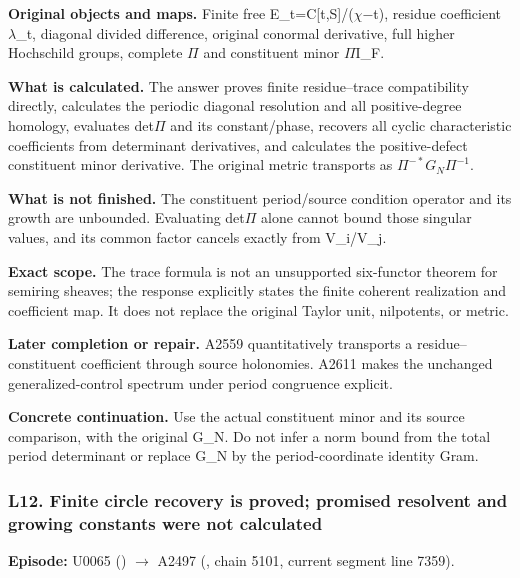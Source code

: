 \textbf{Original objects and maps.} Finite free
E\_t=C[t,S]/(\allowbreak{}\ensuremath{χ}\allowbreak{}\allowbreak{}\ensuremath{−}\allowbreak{}t),
residue coefficient \allowbreak{}\ensuremath{λ}\allowbreak{}\_t,
diagonal divided difference, original conormal derivative, full higher
Hochschild groups, complete \allowbreak{}\ensuremath{Π}\allowbreak{} and
constituent minor \allowbreak{}\ensuremath{Π}\allowbreak{}I\_F.

\textbf{What is calculated.} The answer proves finite residue--trace
compatibility directly, calculates the periodic diagonal resolution and
all positive-degree homology, evaluates
det\allowbreak{}\ensuremath{Π}\allowbreak{} and its constant/phase,
recovers all cyclic characteristic coefficients from determinant
derivatives, and calculates the positive-defect constituent minor
derivative. The original metric transports as \(\Pi^{-*}G_N\Pi^{-1}\).

\textbf{What is not finished.} The constituent period/source condition
operator and its growth are unbounded. Evaluating
det\allowbreak{}\ensuremath{Π}\allowbreak{} alone cannot bound those
singular values, and its common factor cancels exactly from V\_i/V\_j.

\textbf{Exact scope.} The trace formula is not an unsupported
six-functor theorem for semiring sheaves; the response explicitly states
the finite coherent realization and coefficient map. It does not replace
the original Taylor unit, nilpotents, or metric.

\textbf{Later completion or repair.} A2559 quantitatively transports a
residue--constituent coefficient through source holonomies. A2611 makes
the unchanged generalized-control spectrum under period congruence
explicit.

\textbf{Concrete continuation.} Use the actual constituent minor and its
source comparison, with the original G\_N. Do not infer a norm bound
from the total period determinant or replace G\_N by the
period-coordinate identity Gram.

\subsubsection{L12. Finite circle recovery is proved; promised resolvent
and growing constants were not
calculated}\label{l12.-finite-circle-recovery-is-proved-promised-resolvent-and-growing-constants-were-not-calculated}

\textbf{Episode:} U0065
(\protect{})
\allowbreak{}\ensuremath{→}\allowbreak{} A2497
(\protect{}, chain 5101,
current segment line 7359).

